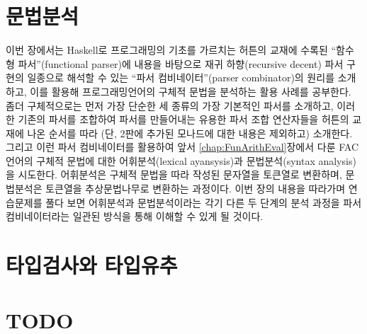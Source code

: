 \chapter{문법분석}\label{chap:parser}
이번 장에서는 Haskell로 프로그래밍의 기초를 가르치는
허튼\cite{Hutton2016pih2nd}의 교재에 수록된
``함수형 파서''(functional parser)에 내용을 바탕으로
재귀 하향(recursive decent) 파서 구현의 일종으로 해석할 수 있는
``파서 컴비네이터''(parser combinator)의 원리를 소개하고,
이를 활용해 프로그래밍언어의 구체적 문법을 분석하는 활용 사례를 공부한다.
좀더 구체적으로는 먼저 가장 단순한 세 종류의 가장 기본적인 파서를 소개하고,
이러한 기존의 파서를 조합하여 파서를 만들어내는 유용한 파서 조합 연산자들을
허튼의 교재에 나온 순서를 따라 (단, 2판에 추가된 모나드에 대한
내용은 제외하고) 소개한다. 그리고 이런 파서 컴비네이터를 활용하여
앞서 \ref{chap:FunArithEval}장에서 다룬 FAC언어의 구체적 문법에 대한
어휘분석(lexical ayansysis)과 문법분석(syntax analysis)을 시도한다.
어휘분석은 구체적 문법을 따라 작성된 문자열을 토큰열로 변환하며,
문법분석은 토큰열을 추상문법나무로 변환하는 과정이다.
이번 장의 내용을 따라가며 연습문제를 풀다 보면
어휘분석과 문법분석이라는 각기 다른 두 단계의 분석 과정을
파서 컴비네이터라는 일관된 방식을 통해 이해할 수 있게 될 것이다.
\newpage


\chapter{타입검사와 타입유추}\label{chap:TyChk}


\newpage
\chapter{TODO}


